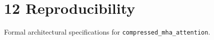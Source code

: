 \section{12 Reproducibility}

Formal architectural specifications for \texttt{compressed_mha_attention}.
